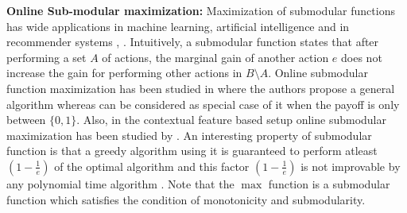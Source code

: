 \textbf{Online Sub-modular maximization:} Maximization of submodular functions has wide applications in machine learning, artificial
intelligence and in recommender systems \citep{nemhauser1978analysis}, \citep{krause2014submodular}. Intuitively, a submodular function states that after performing a set $A$ of actions, the marginal gain of another action $e$ does not increase the gain for performing other actions in $B \setminus A$. Online submodular function maximization has been studied in \citet{streeter2009online} where the authors propose a general algorithm whereas  \citet{radlinski2008learning} can be considered as special case of it when the payoff is only between $\lbrace 0, 1\rbrace$. Also, in the contextual feature based setup online  submodular maximization has been studied by  \citet{yue2011linear}. An interesting property of submodular function is that a greedy algorithm using it is guaranteed to perform atleast $\left( 1 - \frac{1}{e}\right)$ of the optimal algorithm and this factor $\left( 1 - \frac{1}{e}\right)$ is not improvable by any polynomial time algorithm \citep{nemhauser1978analysis}. Note that the $\max$ function is a  submodular function which satisfies the condition of monotonicity and submodularity.





